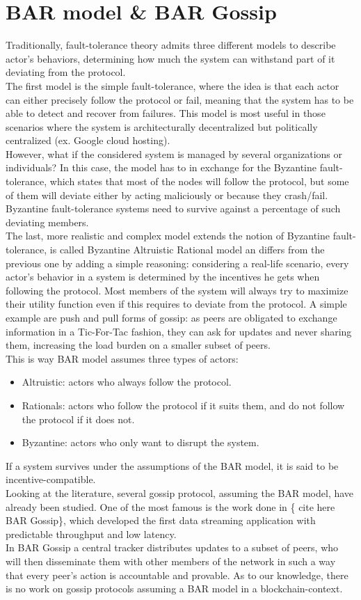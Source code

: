 \documentclass[mscthesis]{usiinfthesis}
\begin{document}
\section{BAR model \& BAR Gossip}
Traditionally, fault-tolerance theory admits three different models to describe actor's behaviors, determining how much the system can withstand part of it deviating from the protocol. \\
The first model is the simple fault-tolerance, where the idea is that each actor can either precisely follow the protocol or fail, meaning that the system has to be able to detect and recover from failures. This model is most useful in those scenarios where the system is architecturally decentralized but politically centralized (ex. Google cloud hosting). \\
However, what if the considered system is managed by several organizations or individuals? In this case, the model has to in exchange for the Byzantine fault-tolerance, which states that most of the nodes will follow the protocol, but some of them will deviate either by acting maliciously or because they crash/fail. Byzantine fault-tolerance systems need to survive against a percentage of such deviating members. \\
The last, more realistic and complex model extends the notion of Byzantine fault-tolerance, is called Byzantine Altruistic Rational model an differs from the previous one by adding a simple reasoning: considering a real-life scenario, every actor's behavior in a system is determined by the incentives he gets when following the protocol. Most members of the system will always try to maximize their utility function even if this requires to deviate from the protocol. A simple example are push and pull forms of gossip: as peers are obligated to exchange information in a Tic-For-Tac fashion, they can ask for updates and never sharing them, increasing the load burden on a smaller subset of peers. \\
This is way BAR model assumes three types of actors:
\begin{itemize}
	\item Altruistic: actors who always follow the protocol.
	\item Rationals: actors who follow the protocol if it suits them, and do not follow the protocol if it does not.
	\item Byzantine: actors who only want to disrupt the system.
\end{itemize}
If a system survives under the assumptions of the BAR model, it is said to be incentive-compatible. \\
Looking at the literature, several gossip protocol, assuming the BAR model, have already been studied. One of the most famous is the work done in \{ cite here BAR Gossip\}, which developed the first data streaming application with predictable throughput and low latency. \\
 In BAR Gossip a central tracker distributes updates to a subset of peers, who will then disseminate them with other members of the network in such a way that every peer's action is accountable and provable. As to our knowledge, there is no work on gossip protocols assuming a BAR model in a blockchain-context.
\end{document}
